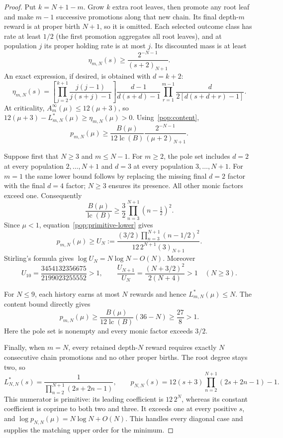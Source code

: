 \begin{proof}
Put $k=N+1-m$. Grow $k$ extra root leaves, then promote any root
leaf and make $m-1$ successive promotions along that new chain.
Its final depth-$m$ reward is at proper birth $N+1$, so it is omitted.
Each selected outcome class has rate at least $1/2$ (the first
promotion aggregates all root leaves), and at population $j$ its proper holding
rate is at most $j$. Its discounted mass is at least
\[
 \eta_{m,N}(s)\ge\frac{2^{-N-1}}{(s+2)_{N+1}}.
\]
An exact expression, if desired, is obtained with $d=k+2$:
\[
 \eta_{m,N}(s)=
 \left[\prod_{j=2}^{k+1}
       \frac{j(j-1)}{j(s+j)-1}\right]
 \frac{d-1}{d(s+d)-1}
 \prod_{r=1}^{m-1}\frac{d}{2[d(s+d+r)-1]}.
\]
At criticality, $A_m^\infty(\mu)\le12(\mu+3)$, so
$12(\mu+3)-L^*_{m,N}(\mu)\ge\eta_{m,N}(\mu)>0$.
Using~\eqref{pop:content},
\begin{equation}\label{pop:primitive-lower}
 p_{m,N}(\mu)
 \ge\frac{B(\mu)}{12\operatorname{lc}(B)}
          \frac{2^{-N-1}}{(\mu+2)_{N+1}}.
\end{equation}

Suppose first that $N\ge3$ and $m\le N-1$. For $m\ge2$,
the pole set includes $d=2$ at every population $2,\ldots,N+1$
and $d=3$ at every population $3,\ldots,N+1$. For $m=1$ the
same lower bound follows by replacing the missing final $d=2$
factor with the final $d=4$ factor; $N\ge3$ ensures its presence.
All other monic factors exceed one. Consequently
\[
 \frac{B(\mu)}{\operatorname{lc}(B)}
 \ge\frac32\prod_{n=3}^{N+1}(n-\tfrac12)^2.
\]
Since $\mu<1$, equation~\eqref{pop:primitive-lower} gives
\begin{equation}\label{pop:explicit-growth}
 p_{m,N}(\mu)\ge U_N:=
 \frac{(3/2)\prod_{n=3}^{N+1}(n-1/2)^2}
      {12\,2^{N+1}(3)_{N+1}}.
\end{equation}
Stirling's formula gives $\log U_N=N\log N-O(N)$.
Moreover
\[
 U_{10}=\frac{3454132356675}{2199023255552}>1,
 \qquad
 \frac{U_{N+1}}{U_N}=\frac{(N+3/2)^2}{2(N+4)}>1
 \quad(N\ge3).
\]

For $N\le9$, each history earns at most $N$ rewards and hence
$L^*_{m,N}(\mu)\le N$. The content bound directly gives
\[
 p_{m,N}(\mu)
 \ge\frac{B(\mu)}{12\operatorname{lc}(B)}(36-N)
 \ge\frac{27}{8}>1.
\]
Here the pole set is nonempty and every monic factor exceeds $3/2$.

Finally, when $m=N$, every retained depth-$N$ reward requires
exactly $N$ consecutive chain promotions and no other proper births.
The root degree stays two, so
\[
 L^*_{N,N}(s)=\frac1{\prod_{n=2}^{N+1}(2s+2n-1)},\qquad
 p_{N,N}(s)=12(s+3)\prod_{n=2}^{N+1}(2s+2n-1)-1.
\]
This numerator is primitive: its leading coefficient is $12\,2^N$,
whereas its constant coefficient is coprime to both two and three.
It exceeds one at every positive $s$, and
$\log p_{N,N}(\mu)=N\log N+O(N)$. This handles every diagonal
case and supplies the matching upper order for the minimum.
\end{proof}

